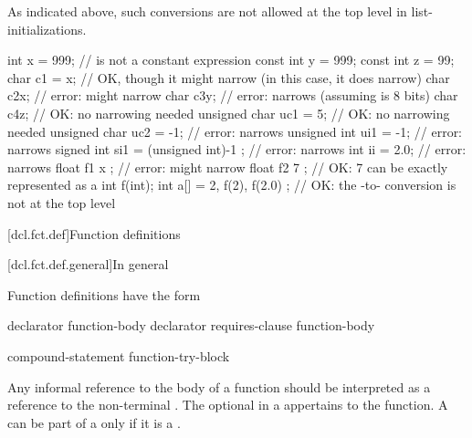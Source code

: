 \begin{note} As indicated above, such conversions are not allowed at the top level in
list-initializations.\end{note} \begin{example}

\begin{codeblock}
int x = 999;                    //  is not a constant expression
const int y = 999;
const int z = 99;
char c1 = x;                    // OK, though it might narrow (in this case, it does narrow)
char c2{x};                     // error: might narrow
char c3{y};                     // error: narrows (assuming  is 8 bits)
char c4{z};                     // OK: no narrowing needed
unsigned char uc1 = {5};        // OK: no narrowing needed
unsigned char uc2 = {-1};       // error: narrows
unsigned int ui1 = {-1};        // error: narrows
signed int si1 =
  { (unsigned int)-1 };         // error: narrows
int ii = {2.0};                 // error: narrows
float f1 { x };                 // error: might narrow
float f2 { 7 };                 // OK: 7 can be exactly represented as a 
int f(int);
int a[] = { 2, f(2), f(2.0) };  // OK: the -to- conversion is not at the top level
\end{codeblock}
\end{example}%
%
%

[dcl.fct.def]{Function definitions}%

[dcl.fct.def.general]{In general}

\pnum
{}%
Function definitions have the form

%
%
\begin{bnf}
\br
      declarator  function-body\br
      declarator requires-clause function-body
\end{bnf}

\begin{bnf}
\br
     compound-statement\br
    function-try-block\br
    \br
\end{bnf}

Any informal reference to the body of a function should be interpreted as a reference to
the non-terminal .
The optional  in a 
appertains to the function.
A  can be part of a 
only if it is a .

